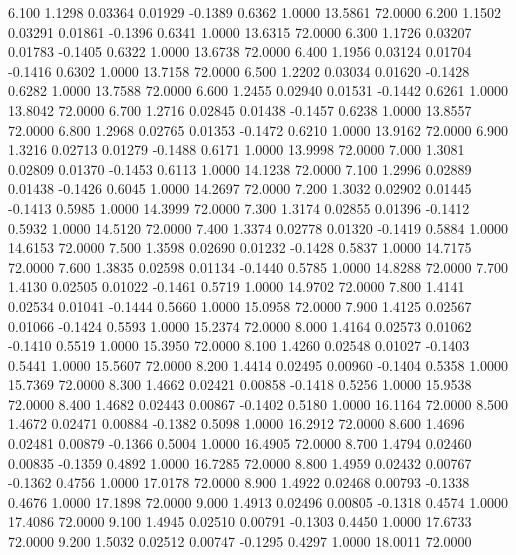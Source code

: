   6.100   1.1298   0.03364   0.01929  -0.1389   0.6362   1.0000  13.5861  72.0000
   6.200   1.1502   0.03291   0.01861  -0.1396   0.6341   1.0000  13.6315  72.0000
   6.300   1.1726   0.03207   0.01783  -0.1405   0.6322   1.0000  13.6738  72.0000
   6.400   1.1956   0.03124   0.01704  -0.1416   0.6302   1.0000  13.7158  72.0000
   6.500   1.2202   0.03034   0.01620  -0.1428   0.6282   1.0000  13.7588  72.0000
   6.600   1.2455   0.02940   0.01531  -0.1442   0.6261   1.0000  13.8042  72.0000
   6.700   1.2716   0.02845   0.01438  -0.1457   0.6238   1.0000  13.8557  72.0000
   6.800   1.2968   0.02765   0.01353  -0.1472   0.6210   1.0000  13.9162  72.0000
   6.900   1.3216   0.02713   0.01279  -0.1488   0.6171   1.0000  13.9998  72.0000
   7.000   1.3081   0.02809   0.01370  -0.1453   0.6113   1.0000  14.1238  72.0000
   7.100   1.2996   0.02889   0.01438  -0.1426   0.6045   1.0000  14.2697  72.0000
   7.200   1.3032   0.02902   0.01445  -0.1413   0.5985   1.0000  14.3999  72.0000
   7.300   1.3174   0.02855   0.01396  -0.1412   0.5932   1.0000  14.5120  72.0000
   7.400   1.3374   0.02778   0.01320  -0.1419   0.5884   1.0000  14.6153  72.0000
   7.500   1.3598   0.02690   0.01232  -0.1428   0.5837   1.0000  14.7175  72.0000
   7.600   1.3835   0.02598   0.01134  -0.1440   0.5785   1.0000  14.8288  72.0000
   7.700   1.4130   0.02505   0.01022  -0.1461   0.5719   1.0000  14.9702  72.0000
   7.800   1.4141   0.02534   0.01041  -0.1444   0.5660   1.0000  15.0958  72.0000
   7.900   1.4125   0.02567   0.01066  -0.1424   0.5593   1.0000  15.2374  72.0000
   8.000   1.4164   0.02573   0.01062  -0.1410   0.5519   1.0000  15.3950  72.0000
   8.100   1.4260   0.02548   0.01027  -0.1403   0.5441   1.0000  15.5607  72.0000
   8.200   1.4414   0.02495   0.00960  -0.1404   0.5358   1.0000  15.7369  72.0000
   8.300   1.4662   0.02421   0.00858  -0.1418   0.5256   1.0000  15.9538  72.0000
   8.400   1.4682   0.02443   0.00867  -0.1402   0.5180   1.0000  16.1164  72.0000
   8.500   1.4672   0.02471   0.00884  -0.1382   0.5098   1.0000  16.2912  72.0000
   8.600   1.4696   0.02481   0.00879  -0.1366   0.5004   1.0000  16.4905  72.0000
   8.700   1.4794   0.02460   0.00835  -0.1359   0.4892   1.0000  16.7285  72.0000
   8.800   1.4959   0.02432   0.00767  -0.1362   0.4756   1.0000  17.0178  72.0000
   8.900   1.4922   0.02468   0.00793  -0.1338   0.4676   1.0000  17.1898  72.0000
   9.000   1.4913   0.02496   0.00805  -0.1318   0.4574   1.0000  17.4086  72.0000
   9.100   1.4945   0.02510   0.00791  -0.1303   0.4450   1.0000  17.6733  72.0000
   9.200   1.5032   0.02512   0.00747  -0.1295   0.4297   1.0000  18.0011  72.0000
